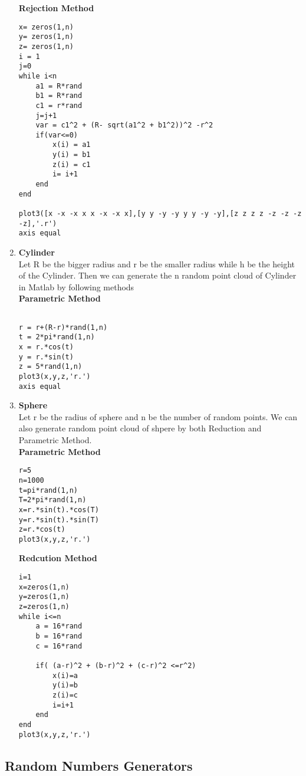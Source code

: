 \documentclass[12pt]{article}
\begin{document}
\begin{enumerate}
\textbf{Rejection Method}\\
\begin{verbatim}
x= zeros(1,n)
y= zeros(1,n)
z= zeros(1,n)
i = 1
j=0
while i<n
    a1 = R*rand
    b1 = R*rand
    c1 = r*rand
    j=j+1
    var = c1^2 + (R- sqrt(a1^2 + b1^2))^2 -r^2
    if(var<=0)
        x(i) = a1
        y(i) = b1
        z(i) = c1
        i= i+1
    end
end

plot3([x -x -x x x -x -x x],[y y -y -y y y -y -y],[z z z z -z -z -z -z],'.r')
axis equal
\end{verbatim}

\item\textbf{Cylinder}\\
Let R be the bigger radius and r be the smaller radius while h be the height of the Cylinder. Then we can generate the n random point cloud of Cylinder in Matlab  by following methods\\
\textbf{Parametric Method}\\
\begin{verbatim}

r = r+(R-r)*rand(1,n)
t = 2*pi*rand(1,n)
x = r.*cos(t)
y = r.*sin(t)
z = 5*rand(1,n)
plot3(x,y,z,'r.')
axis equal
\end{verbatim}

\item\textbf{Sphere}\\
Let r be the radius of sphere and n be the number of random points. We can also generate random point cloud of shpere by both Reduction and Parametric Method.\\
\textbf{Parametric Method}\\

\begin{verbatim}
r=5
n=1000
t=pi*rand(1,n)
T=2*pi*rand(1,n)
x=r.*sin(t).*cos(T)
y=r.*sin(t).*sin(T)
z=r.*cos(t)
plot3(x,y,z,'r.')
\end{verbatim}

\textbf{Redcution Method}\\
\begin{verbatim}
i=1
x=zeros(1,n)
y=zeros(1,n)
z=zeros(1,n)
while i<=n
    a = 16*rand
    b = 16*rand
    c = 16*rand
    
    if( (a-r)^2 + (b-r)^2 + (c-r)^2 <=r^2)
        x(i)=a
        y(i)=b
        z(i)=c
        i=i+1
    end
end
plot3(x,y,z,'r.')
\end{verbatim}
\end{enumerate}

\subsection{Random Numbers Generators}
\end{document}
